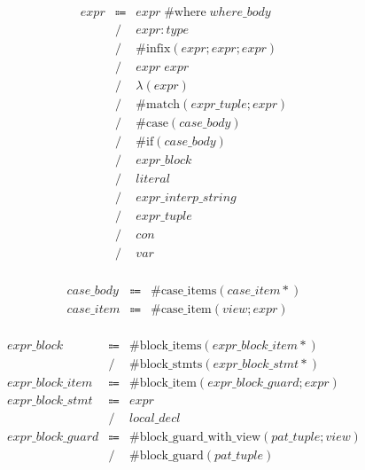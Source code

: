 \begin{align*}
    \begin{array}{rcll}
        \mathit{expr}
        &\Coloneq &\mathit{expr}\;\mathrm{\#where}\;\mathit{where\_body} \\
        &\mathrel{/} &\mathit{expr}: \mathit{type} \\
        &\mathrel{/} &\mathrm{\#infix}(\mathit{expr}; \mathit{expr}; \mathit{expr}) \\
        &\mathrel{/} &\mathit{expr}\; \mathit{expr} \\
        &\mathrel{/} &\lambda(\mathit{expr}) \\
        &\mathrel{/} &\mathrm{\#match}(\mathit{expr\_tuple}; \mathit{expr}) \\
        &\mathrel{/} &\mathrm{\#case}(\mathit{case\_body}) \\
        &\mathrel{/} &\mathrm{\#if}(\mathit{case\_body}) \\
        &\mathrel{/} &\mathit{expr\_block} \\
        &\mathrel{/} &\mathit{literal} \\
        &\mathrel{/} &\mathit{expr\_interp\_string} \\
        &\mathrel{/} &\mathit{expr\_tuple} \\
        &\mathrel{/} &\mathit{con} \\
        &\mathrel{/} &\mathit{var}
    \end{array}
\end{align*}

\begin{align*}
    \begin{array}{rcll}
        \mathit{case\_body}
        &\Coloneq &\mathrm{\#case\_items}(\mathit{case\_item}{*}) \\
        \mathit{case\_item}
        &\Coloneq &\mathrm{\#case\_item}(\mathit{view}; \mathit{expr})
    \end{array}
\end{align*}

\begin{align*}
    \begin{array}{rcll}
        \mathit{expr\_block}
        &\Coloneq &\mathrm{\#block\_items}(\mathit{expr\_block\_item}{*}) \\
        &\mathrel{/} &\mathrm{\#block\_stmts}(\mathit{expr\_block\_stmt}{*}) \\
        \mathit{expr\_block\_item}
        &\Coloneq &\mathrm{\#block\_item}(\mathit{expr\_block\_guard}; \mathit{expr}) \\
        \mathit{expr\_block\_stmt}
        &\Coloneq &\mathit{expr} \\
        &\mathrel{/} &\mathit{local\_decl} \\
        \mathit{expr\_block\_guard}
        &\Coloneq &\mathrm{\#block\_guard\_with\_view}(\mathit{pat\_tuple}; \mathit{view}) \\
        &\mathrel{/} &\mathrm{\#block\_guard}(\mathit{pat\_tuple})
    \end{array}
\end{align*}

